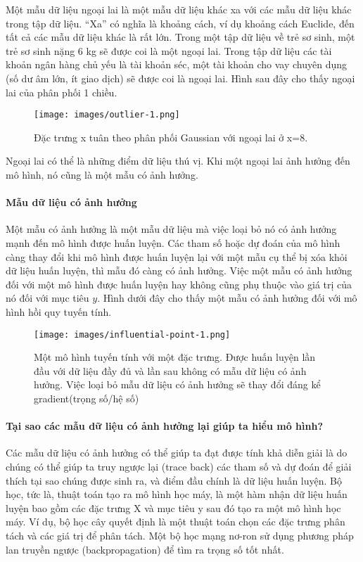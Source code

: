 Một mẫu dữ liệu ngoại lai là một mẫu dữ liệu khác xa với các mẫu dữ liệu khác trong tập dữ liệu. ``Xa'' có nghĩa là khoảng cách, ví dụ khoảng cách Euclide, đến tất cả các mẫu dữ liệu khác là rất lớn. Trong một tập dữ liệu về trẻ sơ sinh, một trẻ sơ sinh nặng 6 kg sẽ được coi là một ngoại lai. Trong tập dữ liệu các tài khoản ngân hàng chủ yếu là tài khoản séc, một tài khoản cho vay chuyên dụng (số dư âm lớn, ít giao dịch) sẽ được coi là ngoại lai. Hình sau đây cho thấy ngoại lai của phân phối 1 chiều.

\begin{figure}[h!]
    \centering
    \texttt{[image: images/outlier-1.png]}
    \label{fig:6_11}
    \caption{Đặc trưng x tuân theo phân phối Gaussian với ngoại lai ở x=8.}
\end{figure}

Ngoại lai có thể là những điểm dữ liệu thú vị. Khi một ngoại lai ảnh hưởng đến mô hình, nó cũng là một mẫu có ảnh hưởng.

\paragraph{Mẫu dữ liệu có ảnh hưởng}

Một mẫu có ảnh hưởng là một mẫu dữ liệu mà việc loại bỏ nó có ảnh hưởng mạnh đến mô hình được huấn luyện. Các tham số hoặc dự đoán của mô hình càng thay đổi khi mô hình được huấn luyện lại với một mẫu cụ thể bị xóa khỏi dữ liệu huấn luyện, thì mẫu đó càng có ảnh hưởng. Việc một mẫu có ảnh hưởng đối với một mô hình được huấn luyện hay không cũng phụ thuộc vào giá trị của nó đối với mục tiêu $y$. Hình dưới đây cho thấy một mẫu có ảnh hưởng đối với mô hình hồi quy tuyến tính.

\begin{figure}[h!]
    \centering
    \texttt{[image: images/influential-point-1.png]}
    \caption{Một mô hình tuyến tính với một đặc trưng. Được huấn luyện lần đầu với dữ liệu đầy đủ và lần sau không có mẫu dữ liệu có ảnh hưởng. Việc loại bỏ mẫu dữ liệu có ảnh hưởng sẽ thay đổi đáng kể gradient(trọng số/hệ số)}
    \label{fig:6_12}
\end{figure}

\paragraph{Tại sao các mẫu dữ liệu có ảnh hưởng lại giúp ta hiểu mô hình?}

Các mẫu dữ liệu có ảnh hưởng có thể giúp ta đạt được tính khả diễn giải là do chúng có thể giúp ta truy ngược lại (trace back) các tham số và dự đoán để giải thích tại sao chúng được sinh ra, và điểm đầu chính là dữ liệu huấn luyện. Bộ học, tức là, thuật toán tạo ra mô hình học máy, là một hàm nhận dữ liệu huấn luyện bao gồm các đặc trưng X và mục tiêu y sau đó tạo ra một mô hình học máy. Ví dụ, bộ học cây quyết định là một thuật toán chọn các đặc trưng phân tách và các giá trị để phân tách. Một bộ học mạng nơ-ron sử dụng phương pháp lan truyền ngược (backpropagation) để tìm ra trọng số tốt nhất.

